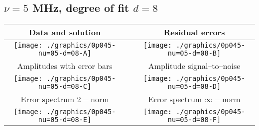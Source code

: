 

% 

\clearpage{}
\break{}

\subsection{$\nu = 5$ MHz, degree of fit $d = 8$}

\begin{table}[h]
    \begin{center}
        \begin{tabular}{ccc}
            Data and solution & \quad & Residual errors \\\hline
            \texttt{[image: ./graphics/0p045-nu=05-d=08-A]} &&
            \texttt{[image: ./graphics/0p045-nu=05-d=08-B]} \\[15pt]
            Amplitudes with error bars && Amplitude signal--to--noise \\\hline
            \texttt{[image: ./graphics/0p045-nu=05-d=08-C]} &&
            \texttt{[image: ./graphics/0p045-nu=05-d=08-D]} \\[15pt]
            Error spectrum $2-$norm && Error spectrum $\infty-$norm \\\hline
            \texttt{[image: ./graphics/0p045-nu=05-d=08-E]} &&
            \texttt{[image: ./graphics/0p045-nu=05-d=08-F]} \\[15pt]
        \end{tabular}
    \end{center}
\label{fig:elev=45, nu=5}
\end{table}



\endinput
